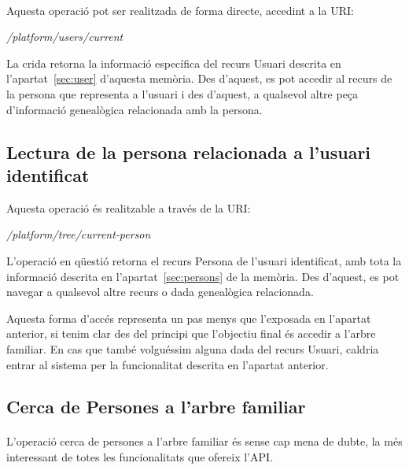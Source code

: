         \paragraph{}
        Aquesta operació pot ser realitzada de forma directe, accedint a la URI:

        \begin{displayquote}
            \emph{/platform/users/current}
        \end{displayquote}

        La crida retorna la informació específica del recurs Usuari descrita en l'apar\-tat~\ref{sec:user} d'aquesta memòria. Des d'aquest, es pot accedir al recurs de la persona que re\-pre\-sen\-ta a l'usuari i des d’aquest, a qualsevol altre peça d'informació genealògica relacionada amb la persona.


    \subsection{Lectura de la persona relacionada a l'usuari identificat}

        Aquesta operació és realitzable a través de la URI:

        \begin{displayquote}
            \emph{/platform/tree/current-person}
        \end{displayquote}

        L'operació en qüestió retorna el recurs Persona de l'usuari identificat, amb tota la informació descrita en l'apartat~\ref{sec:persons} de la memòria. Des d'aquest, es pot navegar a qualsevol altre recurs o dada genealògica relacionada.

        Aquesta forma d'accés representa un pas menys que l’exposada en l’apartat anterior, si tenim clar des del principi que l'objectiu final és accedir a l'arbre familiar. En cas que també volguéssim alguna dada del recurs Usuari, caldria entrar al sistema per la funcionalitat descrita en l'apartat anterior.


    \subsection{Cerca de Persones a l'arbre familiar}\label{sec:searchParams}

        \paragraph{}
        L'operació cerca de persones a l'arbre familiar és sense cap mena de dubte, la més interessant de totes les funcionalitats que ofereix l'API.

